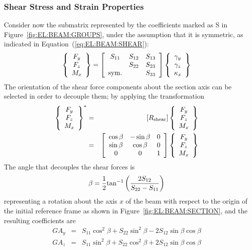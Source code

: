 \subsubsection{Shear Stress and Strain Properties}
Consider now the submatrix represented by the coefficients 
marked as S in Figure~\ref{fig:EL:BEAM:GROUPS}, under the assumption 
that it is symmetric, as indicated in Equation~(\ref{eq:EL:BEAM:SHEAR}):
\begin{equation}
	\cubr{\cvvect{
		F_y \\
		F_z \\
		M_x
	}} = \sqbr{\matr{ccc}{
		S_{11} & S_{12} & S_{13} \\
		 & S_{22} & S_{23} \\
		\llk{sym.} & & S_{33}
	}}\cubr{\cvvect{
		\gamma_y \\
		\gamma_z \\
		\kappa_x
	}}
	\label{eq:EL:BEAM:SHEAR}
\end{equation}
The orientation of the shear force components about the section axis
can be selected in order to decouple them; by applying the transformation
\begin{eqnarray}
	\cubr{\cvvect{
		F_y \\
		F_z \\
		M_x
	}}^*
	& = & \sqbr{R_{\llk{shear}}}\cubr{\cvvect{
		F_y \\
		F_z \\
		M_x
	}}
	\nonumber \\
	& = & \sqbr{\matr{ccc}{
		\cos\beta & -\sin\beta & 0 \\
		\sin\beta & \cos\beta & 0 \\
		0 & 0 & 1
	}}\cubr{\cvvect{
		F_y \\
		F_z \\
		M_x
	}}
	\label{eq:EL:BEAM:SHEAR-ROTATION}
\end{eqnarray}
The angle that decouples the shear forces is
\begin{equation*}
	\beta = \frac{1}{2}\mathrm{tan}^{-1}\left( \frac{2 S_{12}}{S_{22} - S_{11}} \right)
\end{equation*}
representing a rotation about the axis $x$ of the beam with respect
to the origin of the initial reference frame as shown 
in Figure~\ref{fig:EL:BEAM:SECTION},
and the resulting coefficients are
\begin{eqnarray}
	GA_y & = & S_{11} \cos^2\beta + S_{22} \sin^2\beta
		- 2 S_{12} \sin\beta \cos\beta \\
	GA_z & = & S_{11} \sin^2\beta + S_{22} \cos^2\beta
		+ 2 S_{12} \sin\beta \cos\beta
\end{eqnarray}
